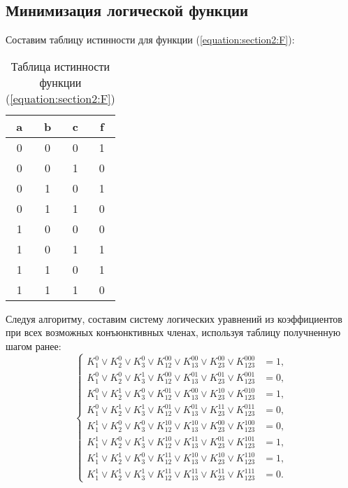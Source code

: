 \subsection{Минимизация логической функции}
Составим таблицу истинности для функции (\ref{equation:section2:F}):
\begin{table}[ht]
\caption{Таблица истинности функции (\ref{equation:section2:F})}
\centering
\begin{tabularx}{\linewidth}{|C|C|C|C|}
\hline
a & b & c & f \\  & 0 & 0 & 1 \\  & 0 & 1 & 0 \\  & 1 & 0 & 1 \\  & 1 & 1 & 0 \\  & 0 & 0 & 0 \\  & 0 & 1 & 1 \\  & 1 & 0 & 1 \\  & 1 & 1 & 0 \\ \hline
\end{tabularx}
\end{table}

Следуя алгоритму, составим систему логических уравнений из коэффициентов при всех возможных конъюнктивных членах, используя таблицу получненную шагом ранее:\\
\[
\begin{cases}
K_1^0 \lor K_2^0 \lor K_3^0 \lor K_{12}^{00} \lor K_{13}^{00} \lor K_{23}^{00} \lor K_{123}^{000}&=1,\\
K_1^0 \lor K_2^0 \lor K_3^1 \lor K_{12}^{00} \lor K_{13}^{01} \lor K_{23}^{01} \lor K_{123}^{001}&=0,\\
K_1^0 \lor K_2^1 \lor K_3^0 \lor K_{12}^{01} \lor K_{13}^{00} \lor K_{23}^{10} \lor K_{123}^{010}&=1,\\
K_1^0 \lor K_2^1 \lor K_3^1 \lor K_{12}^{01} \lor K_{13}^{01} \lor K_{23}^{11} \lor K_{123}^{011}&=0,\\
K_1^1 \lor K_2^0 \lor K_3^0 \lor K_{12}^{10} \lor K_{13}^{10} \lor K_{23}^{00} \lor K_{123}^{100}&=0,\\
K_1^1 \lor K_2^0 \lor K_3^1 \lor K_{12}^{10} \lor K_{13}^{11} \lor K_{23}^{01} \lor K_{123}^{101}&=1,\\
K_1^1 \lor K_2^1 \lor K_3^0 \lor K_{12}^{11} \lor K_{13}^{10} \lor K_{23}^{10} \lor K_{123}^{110}&=1,\\
K_1^1 \lor K_2^1 \lor K_3^1 \lor K_{12}^{11} \lor K_{13}^{11} \lor K_{23}^{11} \lor K_{123}^{111}&=0.
\end{cases}
\]

